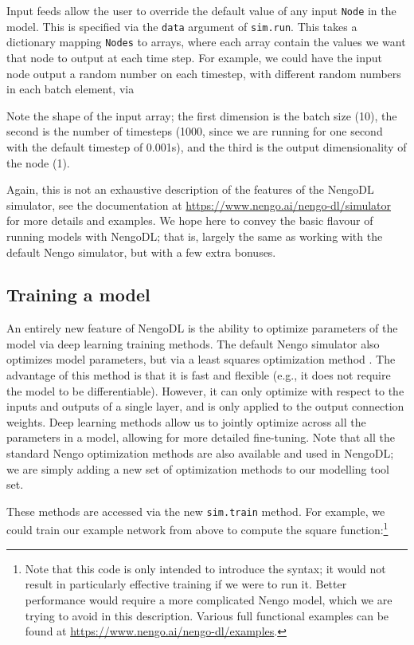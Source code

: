 \documentclass{article}
\begin{document}
Input feeds allow the user to override the default value of any input \texttt{Node} in the model.  This is specified via the \texttt{data} argument of \texttt{sim.run}.  This takes a dictionary mapping \texttt{Nodes} to arrays, where each array contain the values we want that node to output at each time step.  For example, we could have the input node output a random number on each timestep, with different random numbers in each batch element, via



Note the shape of the input array; the first dimension is the batch size (10), the second is the number of timesteps (1000, since we are running for one second with the default timestep of 0.001s), and the third is the output dimensionality of the node (1).

Again, this is not an exhaustive description of the features of the NengoDL simulator, see the documentation at \url{https://www.nengo.ai/nengo-dl/simulator} for more details and examples.  We hope here to convey the basic flavour of running models with NengoDL; that is, largely the same as working with the default Nengo simulator, but with a few extra bonuses.

\subsection{Training a model}
\label{sec:training}

An entirely new feature of NengoDL is the ability to optimize parameters of the model via deep learning training methods.  The default Nengo simulator also optimizes model parameters, but via a least squares optimization method \citep{Eliasmith2003}.  The advantage of this method is that it is fast and flexible (e.g., it does not require the model to be differentiable).  However, it can only optimize with respect to the inputs and outputs of a single layer, and is only applied to the output connection weights.  Deep learning methods allow us to jointly optimize across all the parameters in a model, allowing for more detailed fine-tuning.  Note that all the standard Nengo optimization methods are also available and used in NengoDL; we are simply adding a new set of optimization methods to our modelling tool set.

These methods are accessed via the new \texttt{sim.train} method.  For example, we could train our example network from above to compute the square function:\footnote{Note that this code is only intended to introduce the syntax; it would not result in particularly effective training if we were to run it.  Better performance would require a more complicated Nengo model, which we are trying to avoid in this description.  Various full functional examples can be found at \url{https://www.nengo.ai/nengo-dl/examples}.}
\end{document}
